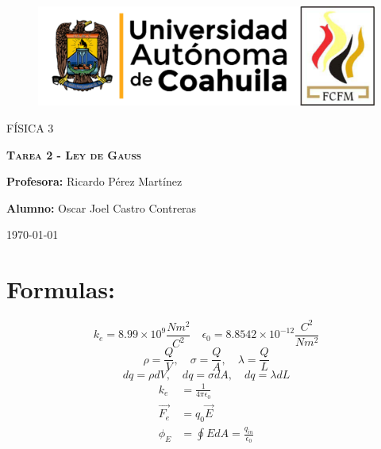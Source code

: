 \documentclass[12pt]{article}
\begin{document}
		
		\begin{titlepage}
		
			\centering
			{\bfseries
			\begin{figure}[h!]
				\centering
				\includegraphics[width=\linewidth]{Nom_UAdeC_FCFM.png} 				
			\end{figure}
			\par}
			\vspace{2cm}
			{\scshape\LARGE FÍSICA 3 \par}
			\vspace{3cm}
			{\scshape\Huge \textbf{Tarea 2 - Ley de Gauss} \par}
			\vfill
			{\LARGE \textbf{Profesora:} Ricardo Pérez Martínez \par}
			\vspace{3cm}
			{\LARGE \textbf{Alumno:} Oscar Joel Castro Contreras \par}
			\vfill
			{\Large \today \par}
			\thispagestyle{empty}
			
		\end{titlepage}
	
		\newpage
		
		\tableofcontents		
		
		\newpage
		
		\section*{Formulas:}\label{sec:Formulas}
			$$ k_e = 8.99 \times 10^9 \frac{Nm^2}{C^2} \quad \epsilon_0 = 8.8542 \times 10^{-12} \frac{C^2}{Nm^2} $$
			$$ \rho = \frac{Q}{V}, \quad \sigma = \frac{Q}{A}, \quad \lambda = \frac{Q}{L} $$
			$$ dq = \rho dV, \quad dq = \sigma dA, \quad dq = \lambda dL $$
			\begin{align}
				k_e &= \frac{1}{4\pi\epsilon_0} \nonumber \\
				\vec{F_e} &= q_0 \vec{E} \\
				\phi_E &= \oint EdA = \frac{q_{in}}{\epsilon_0}
			\end{align}
\end{document}
